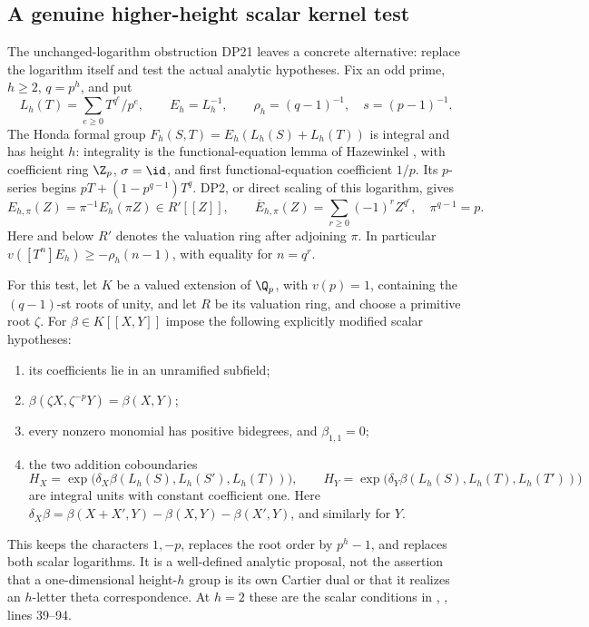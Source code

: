 \subsection{A genuine higher-height scalar kernel test}\label{sec:kerneltest}

The unchanged-logarithm obstruction DP21 leaves a concrete alternative: replace the logarithm itself and test the actual analytic hypotheses. Fix an odd prime, $h\ge2$, $q=p^h$, and put
\[
 L_h(T)=\sum_{e\ge0}T^{q^e}/p^e,\qquad E_h=L_h^{-1},\qquad
 \rho_h=(q-1)^{-1},\quad s=(p-1)^{-1}.
\]
The Honda formal group $F_h(S,T)=E_h(L_h(S)+L_h(T))$ is integral and has height $h$: integrality is the functional-equation lemma of Hazewinkel \cite[Lemma 2.3 and (2.5), p.~74]{Hazewinkel}, with coefficient ring $\Z_p$, $\sigma=\id$, and first functional-equation coefficient $1/p$. Its $p$-series begins $pT+(1-p^{q-1})T^q$. DP2, or direct scaling of this logarithm, gives
\begin{equation}\label{eq:honda-scale}
 E_{h,\pi}(Z)=\pi^{-1}E_h(\pi Z)\in R'[[Z]],\qquad
 \overline E_{h,\pi}(Z)=\sum_{r\ge0}(-1)^rZ^{q^r},\quad \pi^{q-1}=p.
\end{equation}
Here and below $R'$ denotes the valuation ring after adjoining $\pi$. In particular $v([T^n]E_h)\ge-\rho_h(n-1)$, with equality for $n=q^r$.

For this test, let $K$ be a valued extension of $\Q_p$, with $v(p)=1$, containing the $(q-1)$-st roots of unity, and let $R$ be its valuation ring, and choose a primitive root $\zeta$. For $\beta\in K[[X,Y]]$ impose the following explicitly modified scalar hypotheses:
\begin{enumerate}[label=(H\arabic*),leftmargin=2.8em]
\item its coefficients lie in an unramified subfield;
\item $\beta(\zeta X,\zeta^{-p}Y)=\beta(X,Y)$;
\item every nonzero monomial has positive bidegrees, and $\beta_{1,1}=0$;
\item the two addition coboundaries
\[
 H_X=\exp\bigl(\delta_X\beta(L_h(S),L_h(S'),L_h(T))\bigr),\qquad
 H_Y=\exp\bigl(\delta_Y\beta(L_h(S),L_h(T),L_h(T'))\bigr)
\]
are integral units with constant coefficient one. Here $\delta_X\beta=\beta(X+X',Y)-\beta(X,Y)-\beta(X',Y)$, and similarly for $Y$.
\end{enumerate}
This keeps the characters $1,-p$, replaces the root order by $p^h-1$, and replaces both scalar logarithms. It is a well-defined analytic proposal, not the assertion that a one-dimensional height-$h$ group is its own Cartier dual or that it realizes an $h$-letter theta correspondence. At $h=2$ these are the scalar conditions in , , lines 39--94.

